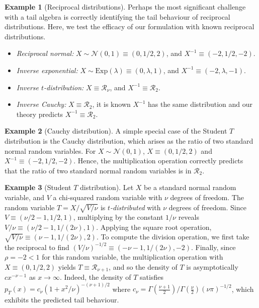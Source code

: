 \documentclass{article}
\theoremstyle{definition}
\newtheorem{example}{Example}
\begin{document}
\begin{example}[Reciprocal distributions]
	Perhaps the most significant challenge with a tail algebra is correctly identifying the tail behaviour of reciprocal distributions. Here, we test the efficacy of our formulation with known reciprocal distributions.
	\begin{itemize}
		\item \emph{Reciprocal normal:} $X \sim \mathcal{N}(0,1) \equiv (0,1/2,2)$, and $X^{-1} \equiv (-2,1/2,-2)$.
		\item \emph{Inverse exponential:} $X \sim \text{Exp}(\lambda) \equiv (0,\lambda,1)$, and $X^{-1} \equiv (-2,\lambda,-1)$.
		\item \emph{Inverse $t$-distribution:} $X \equiv \mathcal{R}_\nu$, and $X^{-1} \equiv \mathcal{R}_2$.
		\item \emph{Inverse Cauchy:} $X \equiv \mathcal{R}_2$, it is known $X^{-1}$
		      has the same distribution and our theory predicts $X^{-1} \equiv \mathcal{R}_2$.
	\end{itemize}
\end{example}

\begin{example}[Cauchy distribution]
	A simple special case of the Student $T$ distribution is the Cauchy distribution, which arises as the ratio of two standard normal random variables. For $X\sim\mathcal{N}(0,1)$, $X \equiv (0,1/2,2)$ and $X^{-1} \equiv (-2,1/2,-2)$. %
	Hence, the multiplication operation correctly predicts that the ratio of two standard normal random variables is in $\mathcal{R}_2$.
\end{example}


\begin{example}[Student $T$ distribution]
	Let $X$ be a standard normal random variable, and $V$ a chi-squared random variable with $\nu$ degrees of freedom. The random variable $T = X / \sqrt{V / \nu}$ is \emph{$t$-distributed} with $\nu$ degrees of freedom. Since $V \equiv (\nu/2-1,1/2,1)$, multiplying by the constant $1/\nu$ reveals $V / \nu \equiv (\nu/2-1,1/(2\nu),1)$. Applying the square root operation, $\sqrt{V / \nu} \equiv (\nu-1,1/(2\nu),2)$. To compute the division operation, we first take the reciprocal to find $(V/\nu)^{-1/2} \equiv (-\nu-1,1/(2\nu),-2)$. Finally, since $\rho = -2 < 1$ for this random variable, the multiplication operation with $X \equiv (0,1/2,2)$ yields $T \equiv \mathcal{R}_{\nu+1}$, and so the density of $T$ is asymptotically $c x^{-\nu-1}$ as $x \to \infty$.
	Indeed, the density of $T$ satisfies $p_T(x) = c_\nu (1 + x^2 / \nu)^{-(\nu+1)/2}$ where $c_\nu = \Gamma(\frac{\nu+1}{2})/\Gamma(\frac{\nu}{2}) (\nu\pi)^{-1/2}$, which exhibits the predicted tail behaviour.
\end{example}
\end{document}
